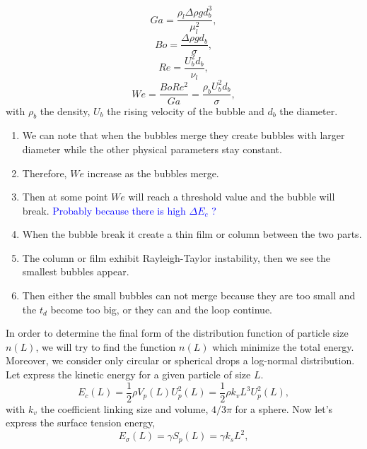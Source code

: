 \documentclass[10pt,a4paper,openany]{article}
\theoremstyle{mytheoremstyle}
\theoremstyle{mytheoremstyle}
\theoremstyle{myproblemstyle}
\begin{document}
\begin{equation*}
    Ga =\frac{\rho_l\Delta\rho g d_b^3}{\mu^2_l},
\end{equation*}
\begin{equation*}
    Bo =\frac{\Delta\rho g d_b}{\sigma},
\end{equation*}
\begin{equation*}
    Re =\frac{U_b^2 d_b}{\nu_l},
\end{equation*}
\begin{equation*}
    We = \frac{BoRe^2}{Ga}=\frac{\rho_b U_b^2 d_b}{\sigma},
\end{equation*}
with $\rho_b$ the density, $U_b$ the rising velocity of the bubble and $d_b$ the diameter. 
\begin{enumerate}
    \item We can note that when the bubbles merge they create bubbles with larger diameter while the other physical parameters stay constant. 
    \item Therefore, $We$ increase as the bubbles merge.
    \item Then at some point $We$ will reach a threshold value and the bubble will break. 
    \textcolor{blue}{Probably because there is high $\Delta E_c$ ?}
    \item When the bubble break it create a thin film or column between the two parts.
    \item The column or film exhibit Rayleigh-Taylor instability, then we see the smallest bubbles appear. 
    \item Then either the small bubbles can not merge because they are too small and the $t_d$ become too big, or they can and the loop continue.
\end{enumerate}
In order to determine the final form of the distribution function of particle size $n(L)$,
we will try to find the function $n(L)$ which minimize the total energy.
Moreover, we consider only circular or spherical drops a log-normal distribution.
Let express the kinetic energy for a given particle of size $L$. 
\begin{equation}
    E_c(L) = \frac{1}{2} \rho V_p(L) U_p^2(L) =\frac{1}{2} \rho k_v L^3 U_p^2(L) ,
    \label{eq:Ec}
\end{equation}
with $k_v$ the coefficient linking size and volume, $4/3 \pi$ for a sphere. 
Now let's express the surface tension energy,
\begin{equation}
    E_\sigma(L) = \gamma S_p(L) =\gamma k_s L^2 ,
    \label{eq:Es}
\end{equation}
\end{document}
